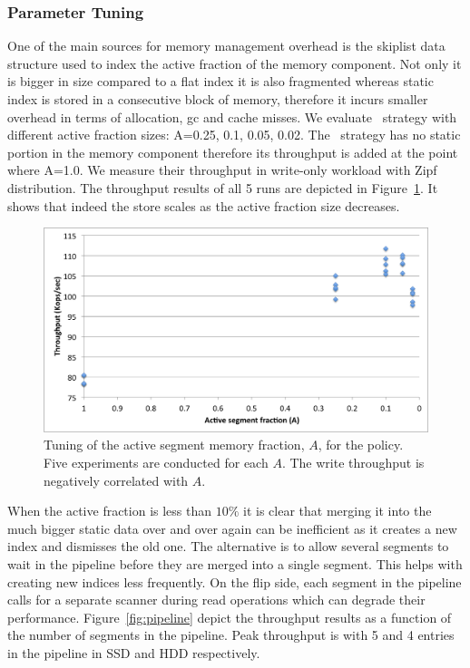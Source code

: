 \subsubsection{Parameter Tuning} \label{ssec:tuning}
One of the main sources for memory management overhead is the skiplist data structure used to index the active fraction of the memory component.
Not only it is bigger in size compared to a flat index it is also fragmented whereas static index is stored in a consecutive block of memory, therefore it incurs smaller overhead in terms of allocation, gc and cache misses.
We evaluate \basic\ strategy with different active fraction sizes: A=0.25, 0.1, 0.05, 0.02. 
The \none\ strategy has no static portion in the memory component therefore its throughput is added at the point where A=1.0.
We measure their throughput in write-only workload with Zipf distribution.
The throughput results of all 5 runs are depicted in  Figure~\ref{fig:dynamic-fraction}. 
It shows that indeed the store scales as the active fraction size decreases. 

\begin{figure}[htb]
\includegraphics[width=\figw]{Figs/dynamic-fraction-1.png}
\caption{Tuning of the active segment memory fraction, $A$, for the \basic\/ policy. Five experiments are conducted for each $A$. 
The write throughput is negatively correlated with $A$.
}
\label{fig:dynamic-fraction}
\end{figure}

When the active fraction is less than $10\%$ it is clear that merging it into the much bigger static data over and over again can be inefficient as it creates a new index and dismisses the old one. 
The alternative is to allow several segments to wait in the pipeline before they are merged into a single segment. This helps with creating new indices less frequently.
On the flip side, each segment in the pipeline calls for a separate scanner during read operations which can degrade their performance.
Figure~\ref{fig:pipeline} depict the throughput results as a function of the number of segments in the pipeline. 
Peak throughput is with 5 and 4 entries in the pipeline in SSD and HDD respectively.

